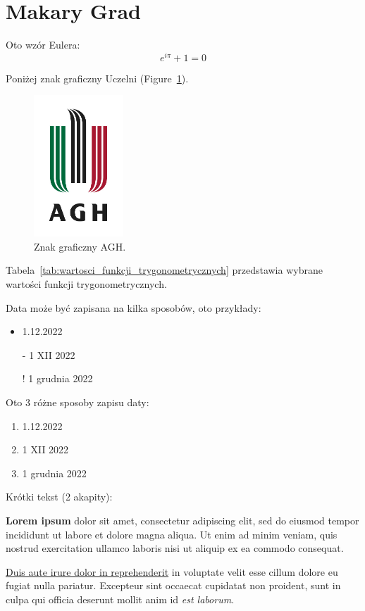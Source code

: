\section{Makary Grad}
\label{sec:makary_grad}

Oto wzór Eulera: \[e^{i\pi}+1=0\]

Poniżej znak graficzny Uczelni (Figure~\ref{fig:agh}).

\begin{figure}[htbp]
    \centering
    \includegraphics[width=0.3\textwidth]{pictures/agh.jpg}
    \caption{Znak graficzny AGH.}
    \label{fig:agh}
\end{figure}

Tabela~\ref{tab:wartosci_funkcji_trygonometrycznych} przedstawia wybrane wartości funkcji trygonometrycznych.



Data może być zapisana na kilka sposobów, oto przykłady:
\begin{itemize}
  \item 1.12.2022
  \item[-] 1 XII 2022
  \item[!] 1 grudnia 2022
\end{itemize}

Oto 3 różne sposoby zapisu daty:
\begin{enumerate}
  \item 1.12.2022
  \item 1 XII 2022
  \item 1 grudnia 2022
\end{enumerate}


Krótki tekst (2 akapity):

\textbf{Lorem ipsum} dolor sit amet, consectetur adipiscing elit, sed do eiusmod tempor incididunt ut labore et dolore magna aliqua. Ut enim ad minim veniam, quis nostrud exercitation ullamco laboris nisi ut aliquip ex ea commodo consequat. \par \underline{Duis aute irure dolor in reprehenderit} in voluptate velit esse cillum dolore eu fugiat nulla pariatur. Excepteur sint occaecat cupidatat non proident, sunt in culpa qui officia deserunt mollit anim id \emph{est laborum}.

